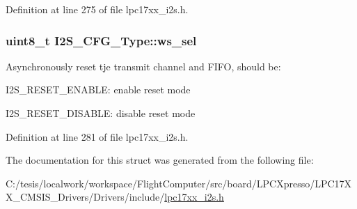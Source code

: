 \-Definition at line 275 of file lpc17xx\-\_\-i2s.\-h.

\hypertarget{struct_i2_s___c_f_g___type_ac6b1a4d4cc8496129ff97ee2e43bd2ec}{
\subsubsection[{ws\-\_\-sel}]{\setlength{\rightskip}{0pt plus 5cm}uint8\-\_\-t {\bf \-I2\-S\-\_\-\-C\-F\-G\-\_\-\-Type\-::ws\-\_\-sel}}}\label{struct_i2_s___c_f_g___type_ac6b1a4d4cc8496129ff97ee2e43bd2ec}
\-Asynchronously reset tje transmit channel and \-F\-I\-F\-O, should be\-:
\begin{DoxyItemize}
\item \-I2\-S\-\_\-\-R\-E\-S\-E\-T\-\_\-\-E\-N\-A\-B\-L\-E\-: enable reset mode
\item \-I2\-S\-\_\-\-R\-E\-S\-E\-T\-\_\-\-D\-I\-S\-A\-B\-L\-E\-: disable reset mode 
\end{DoxyItemize}

\-Definition at line 281 of file lpc17xx\-\_\-i2s.\-h.



\-The documentation for this struct was generated from the following file\-:\begin{DoxyCompactItemize}
\item 
\-C\-:/tesis/localwork/workspace/\-Flight\-Computer/src/board/\-L\-P\-C\-Xpresso/\-L\-P\-C17\-X\-X\-\_\-\-C\-M\-S\-I\-S\-\_\-\-Drivers/\-Drivers/include/\hyperlink{lpc17xx__i2s_8h}{lpc17xx\-\_\-i2s.\-h}\end{DoxyCompactItemize}
